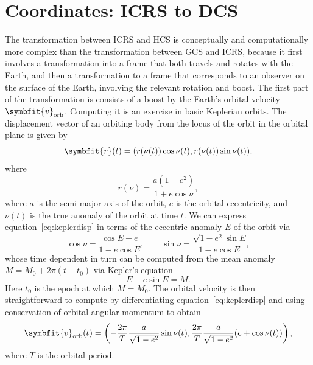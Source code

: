 \documentclass[b5paper, 10pt, twoside]{book}
\renewcommand{\vec}[1]{\symbfit{#1}}
\begin{document}
\section{Coordinates: ICRS to DCS}

The transformation between ICRS and HCS is conceptually and computationally more complex than the transformation between GCS and ICRS, because it first involves a transformation into a frame that both travels and rotates with the Earth, and then a transformation to a frame that corresponds to an observer on the surface of the Earth, involving the relevant rotation and boost. The first part of the transformation is consists of a boost by the Earth's orbital velocity $\vec{v}_\text{orb}$. Computing it is an exercise in basic Keplerian orbits. The displacement vector of an orbiting body from the locus of the orbit in the orbital plane is given by
\begin{equation}
\vec{r}(t)=(r(\nu(t))\cos\nu(t),r(\nu(t))\sin\nu(t)),
\label{eq:keplerdisp}
\end{equation}
where
\begin{equation}
r(\nu)=\frac{a(1-e^2)}{1+e\cos\nu},
\end{equation}
where $a$ is the semi-major axis of the orbit, $e$ is the orbital eccentricity, and $\nu(t)$ is the true anomaly of the orbit at time $t$. We can express equation~\eqref{eq:keplerdisp} in terms of the eccentric anomaly $E$ of the orbit via
\begin{equation}
\cos\nu=\frac{\cos E-e}{1-e\cos E},\qquad\sin\nu=\frac{\sqrt{1-e^2}\sin E}{1-e\cos E},
\end{equation}
whose time dependent in turn can be computed from the mean anomaly $M=M_0+2\pi(t-t_0)$ via Kepler's equation
\begin{equation}
E-e\sin E=M.
\end{equation}
Here $t_0$ is the epoch at which $M=M_0$. The orbital velocity is then straightforward to compute by differentiating equation~\eqref{eq:keplerdisp} and using conservation of orbital angular momentum to obtain
\begin{equation}
\vec{v}_\text{orb}(t)=\left(-\frac{2\pi}{T}\frac{a}{\sqrt{1-e^2}}\sin\nu(t),\frac{2\pi}{T}\frac{a}{\sqrt{1-e^2}}(e+\cos\nu(t))\right),
\label{eq:vorbkep}
\end{equation}
where $T$ is the orbital period.
\end{document}
